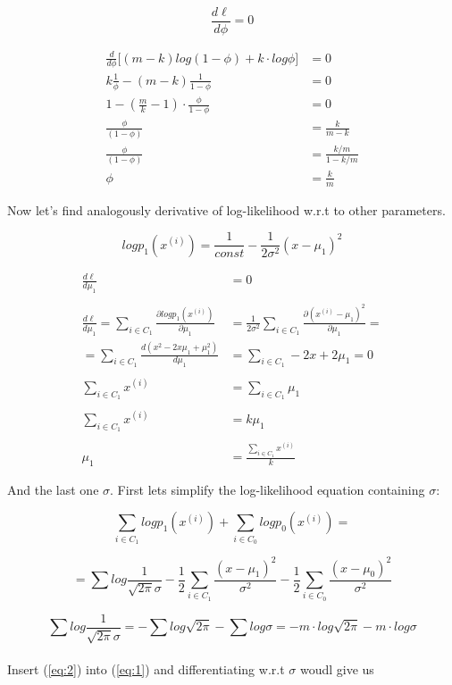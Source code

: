 \documentclass{article}
\begin{document}
\[
\frac{d\ell}{d\phi} = 0
\]

\begin{align*}
\frac {d} {d\phi} \Big[ (m - k)log(1 - \phi) + k \cdot log\phi \Big]  &= 0 \\
k\frac1\phi - (m - k)\frac1{1 - \phi} &= 0 \\
1 - (\frac mk - 1) \cdot \frac\phi{1 - \phi} &= 0 \\
\frac \phi {(1-\phi)} &= \frac k {m - k} \\
\frac \phi {(1-\phi)} &= \frac {k/m} {1 - k/m}\\
\phi &= \frac km
\end{align*}

Now let's find analogously derivative of log-likelihood w.r.t to other parameters.



$$logp_1(x^{(i)}) = \frac 1{const} - \frac1{2\sigma^2} (x - \mu_1)^2$$

\begin{align*}
\frac{d\ell} {d\mu_1} &= 0 \\ \\
\frac{d\ell} {d\mu_1} = 
\sum_{i \in C_1} \frac {\partial logp_1(x^{(i)})} {\partial\mu_1} &= 
\frac1{2\sigma^2} \sum_{i \in C_1} 
\frac{\partial(x^{(i)} - \mu_1)^2}{\partial\mu_1} = \\ =
\sum_{i \in C_1} \frac {d(x^2 - 2x\mu_1 + \mu_1^2)}{d\mu_1} &=
\sum_{i \in C_1} - 2x + 2\mu_1 = 0  \\ \\
\sum_{i \in C_1} x^{(i)} &= \sum_{i \in C_1} \mu_1 \\ \\
\sum_{i \in C_1} x^{(i)} &= k \mu_1 \\ \\
\mu_1 &= \frac {\sum\limits_{i \in C_1} x^{(i)}} k
\end{align*}


And the last one $\sigma$. First lets simplify the log-likelihood equation containing $\sigma$:

$$
\sum_{i \in C_1} logp_1(x^{(i)}) +
\sum_{i \in C_0} logp_0(x^{(i)}) =
$$

\begin{equation} \label{eq:1}
= \sum log \frac 1{\sqrt{2\pi}\sigma} 
- \frac12 \sum_{i \in C_1} \frac {(x - \mu_1)^2}{\sigma^2}
- \frac12 \sum_{i \in C_0} \frac {(x - \mu_0)^2}{\sigma^2}
\end{equation}

\begin{equation} \label{eq:2}
\sum log \frac 1{\sqrt{2\pi}\sigma} = 
- \sum log \sqrt{2\pi} 
- \sum log \sigma =
- m \cdot log \sqrt{2\pi} 
- m \cdot log \sigma
\end{equation}
\\
Insert (\ref{eq:2}) into (\ref{eq:1}) and differentiating w.r.t $\sigma$ woudl give us
\end{document}
